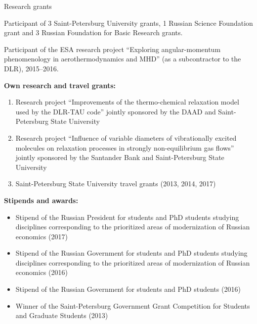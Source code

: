 \documentclass{resume} %
\begin{document}
\begin{rSection}{Research grants}

Participant of 3 Saint-Petersburg University grants, 1 Russian Science Foundation grant and 3 Russian Foundation for Basic Research grants.

Participant of the ESA research project ``Exploring angular-momentum phenomenology in aerothermodynamics and MHD'' (as a subcontractor to the DLR), 2015--2016.

{\bf Own research and travel grants:}

\begin{enumerate}

    \item Research project ``Improvements of the thermo-chemical relaxation model used by the DLR-TAU code'' jointly sponsored by the DAAD and Saint-Petersburg State University
    \item Research project ``Influence of variable diameters of vibrationally excited molecules on relaxation processes in strongly non-equilibrium gas flows'' jointly sponsored by the Santander Bank and Saint-Petersburg State University
    \item Saint-Petersburg State University travel grants (2013, 2014, 2017)

\end{enumerate}

{\bf Stipends and awards:}
\begin{itemize}
    \item Stipend of the Russian President for students and PhD students studying disciplines corresponding to the prioritized areas of modernization of Russian economics (2017)
    \item Stipend of the Russian Government for students and PhD students studying disciplines corresponding to the prioritized areas of modernization of Russian economics (2016)
    \item Stipend of the Russian Government for students and PhD students (2016)
    \item Winner of the Saint-Petersburg Government Grant Competition for Students and Graduate Students (2013)
\end{itemize}
\end{rSection}
\end{document}
